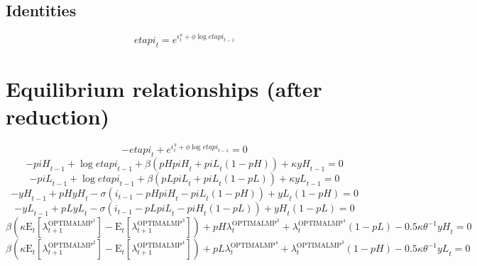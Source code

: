 \subsection{Identities}

\begin{equation}
{e\!t\!a\!p\!i}_{t} = e^{\epsilon^{\pi}_{t} + {\phi} {\log{{e\!t\!a\!p\!i}_{t-1}}}}
\end{equation}




\section{Equilibrium relationships (after reduction)}

\begin{equation}
-{e\!t\!a\!p\!i}_{t} + e^{\epsilon^{\pi}_{t} + {\phi} {\log{{e\!t\!a\!p\!i}_{t-1}}}} = 0
\end{equation}
\begin{equation}
-{p\!i\!H}_{t-1} + \log{{e\!t\!a\!p\!i}_{t-1}} + {\beta} \left({{p\!H}} {{p\!i\!H}_{t}} + {{p\!i\!L}_{t}} \left(1 - {p\!H}\right)\right) + {\kappa} {{y\!H}_{t-1}} = 0
\end{equation}
\begin{equation}
-{p\!i\!L}_{t-1} + \log{{e\!t\!a\!p\!i}_{t-1}} + {\beta} \left({{p\!L}} {{p\!i\!L}_{t}} + {{p\!i\!L}_{t}} \left(1 - {p\!L}\right)\right) + {\kappa} {{y\!L}_{t-1}} = 0
\end{equation}
\begin{equation}
-{y\!H}_{t-1} + {{p\!H}} {{y\!H}_{t}} - {\sigma} \left(i_{t-1} - {{p\!H}} {{p\!i\!H}_{t}} - {{p\!i\!L}_{t}} \left(1 - {p\!H}\right)\right) + {{y\!L}_{t}} \left(1 - {p\!H}\right) = 0
\end{equation}
\begin{equation}
-{y\!L}_{t-1} + {{p\!L}} {{y\!L}_{t}} - {\sigma} \left(i_{t-1} - {{p\!L}} {{p\!i\!L}_{t}} - {{p\!i\!H}_{t}} \left(1 - {p\!L}\right)\right) + {{y\!H}_{t}} \left(1 - {p\!L}\right) = 0
\end{equation}
\begin{equation}
{\beta} \left({\kappa} {\mathrm{E}_{t}\left[\lambda^{\mathrm{OPTIMALMP}^{\mathrm{1}}}_{t+1}\right]} - \mathrm{E}_{t}\left[\lambda^{\mathrm{OPTIMALMP}^{\mathrm{3}}}_{t+1}\right]\right) + {{p\!H}} {\lambda^{\mathrm{OPTIMALMP}^{\mathrm{3}}}_{t}} + {\lambda^{\mathrm{OPTIMALMP}^{\mathrm{4}}}_{t}} \left(1 - {p\!L}\right) - 0.5{\kappa} {\theta}^{-1} {{y\!H}_{t}} = 0
\end{equation}
\begin{equation}
{\beta} \left({\kappa} {\mathrm{E}_{t}\left[\lambda^{\mathrm{OPTIMALMP}^{\mathrm{2}}}_{t+1}\right]} - \mathrm{E}_{t}\left[\lambda^{\mathrm{OPTIMALMP}^{\mathrm{4}}}_{t+1}\right]\right) + {{p\!L}} {\lambda^{\mathrm{OPTIMALMP}^{\mathrm{4}}}_{t}} + {\lambda^{\mathrm{OPTIMALMP}^{\mathrm{3}}}_{t}} \left(1 - {p\!H}\right) - 0.5{\kappa} {\theta}^{-1} {{y\!L}_{t}} = 0
\end{equation}
